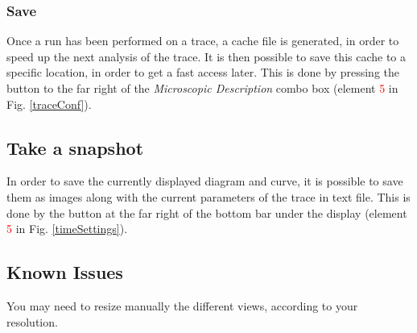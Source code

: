 \documentclass[twoside]{article}
\begin{document}
\begin{sloppypar}
\subsubsection{Save}
Once a run has been performed on a trace, a cache file is generated, in order to speed up the next analysis of the trace. It is then possible to save this cache to a specific location, in order to get a fast access later. This is done by pressing the button to the far right of the \textit{Microscopic Description} combo box (element \textcolor{red}{5} in Fig. \ref{traceConf}).

\subsection{Take a snapshot}
In order to save the currently displayed diagram and curve, it is possible to save them as images along with the current parameters of the trace in text file. This is done by the button at the far right of the bottom bar under the display (element \textcolor{red}{5} in Fig. \ref{timeSettings}). 

\subsection{Known Issues}
You may need to resize manually the different views, according to your resolution.

\newpage

\newpage

{}

\end{sloppypar} 
\end{document}
